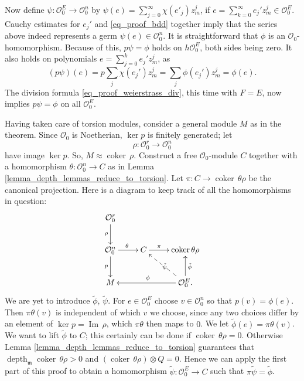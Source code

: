 \documentclass{amsart}
\numberwithin{equation}{section}
\theoremstyle{definition}
\theoremstyle{plain}
\theoremstyle{remark}
\begin{document}
Now define $\psi:{\ensuremath{\mathcal{{O}}}}^E_0\rightarrow{\ensuremath{\mathcal{{O}}}}_0^n$ by
$\psi(e)=\sum_{j=0}^\infty\chi(e'_j)z_m^j$,
if
$e=\sum_{k=0}^\infty e_j'z_m^j\in{\ensuremath{\mathcal{{O}}}}_0^E$.
Cauchy estimates for $e_j'$ and \eqref{eq_proof_bdd}
together imply that the series above indeed represents a germ $\psi(e)\in{\ensuremath{\mathcal{{O}}}}^n_0$.
It is straightforward that $\phi$ is an ${\ensuremath{\mathcal{{O}}}}_0$-homomorphism. Because 
of this, $p\psi=\phi$ holds on $h{\ensuremath{\mathcal{{O}}}}_0^E$, both sides being zero.
It also holds on polynomials $e=\sum_{j=0}^k e_j'z_m^j$, as
\[
	(p\psi)(e)=p\sum_{j}\chi(e_j')z_m^j=\sum_j\phi(e_j')z_m^j=\phi(e).
\]
The division formula \eqref{eq_proof_weierstrass_div}, this time with $F=E$,
now implies $p\psi=\phi$ on all ${\ensuremath{\mathcal{{O}}}}_0^E$.

Having taken care of torsion modules, consider a general module $M$ as
in the theorem. 
Since ${\ensuremath{\mathcal{{O}}}}_0$ is Noetherian, $\ker p$ is finitely generated;
let 
\[
	\rho:{\ensuremath{\mathcal{{O}}}}_0^r\rightarrow {\ensuremath{\mathcal{{O}}}}_0^n
\]
have image $\ker p$. So, $M\approx {{\mathop{\mathrm{coker\,}}}} \rho$. Construct a free 
${\ensuremath{\mathcal{{O}}}}_0$-module $C$ together with a homomorphism
 $\theta:{\ensuremath{\mathcal{{O}}}}_0^n\rightarrow C$ as in Lemma 
\ref{lemma_depth_lemmas_reduce_to_torsion}.
Let $\pi:C\rightarrow{{\mathop{\mathrm{coker\,}}}} \theta\rho$ be the canonical projection.
Here is a diagram to keep track of all the homomorphisms in question:
\begin{equation*}
\xymatrix{
{\ensuremath{\mathcal{{O}}}}_0^r\ar[d]_\rho\\
{\ensuremath{\mathcal{{O}}}}^n_0  \ar[d]_p\ar[r]^\theta &C \ar[r]^-\pi &{{\mathop{\mathrm{coker\,}}}}\theta\rho\\
M & &{\ensuremath{\mathcal{{O}}}}_0^E. \ar[ll]_\phi \ar[u]_{\tilde{\phi}} \ar@{-->}[lu]|{\tilde\psi}\\
}
\end{equation*}
We are yet to introduce $\tilde{\phi}$, $\tilde{\psi}$. For $e\in{\ensuremath{\mathcal{{O}}}}_0^E$
choose $v\in {\ensuremath{\mathcal{{O}}}}_0^n$ so that $p(v)=\phi(e)$.
Then $\pi\theta(v)$ is independent of which $v$ we choose, 
since any two choices differ by an element of $\ker p={{\mathop{\mathrm{Im\,}}}}\rho$, 
which $\pi\theta$ then maps to $0$. We let $\tilde{\phi}(e)=\pi\theta(v)$.
We want to lift $\tilde{\phi}$ to $C$; this certainly can be done if 
${{\mathop{\mathrm{coker\,}}}}\theta\rho=0$. Otherwise Lemma \ref{lemma_depth_lemmas_reduce_to_torsion}
guarantees that ${\mathop{\mathrm{depth}}\nolimits _{{\mathop{\mathfrak{m}}}}}{{\mathop{\mathrm{coker\,}}}}\theta\rho>0$ and 
$({{\mathop{\mathrm{coker\,}}}}\theta\rho)\otimes Q=0$. Hence we can apply the first part of this proof to obtain a homomorphism 
$\tilde{\psi}:{\ensuremath{\mathcal{{O}}}}^E_0\rightarrow C$
such that $\pi\tilde{\psi}=\tilde{\phi}$.
\end{document}
